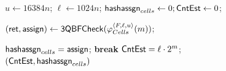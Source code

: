\begin{algorithm}[h]
	\caption{$\mathsf{EqualCellsCounter}(F)$}
	\label{algo:smallcells}
	\begin{algorithmic}[1]
		\State $u \gets 16384n$;
		\State $\ell \gets 1024n$;
                \State $\mathsf{hashassgn}_{cells}\gets 0;\mathsf{CntEst}\gets 0$;



               	\State $\mathsf{(ret,assign)} \gets \mathsf{3QBFCheck}(\varphi^{\langle F,\ell,u\rangle}_{Cells}(m))$; 
               	
		\label{line:eqcells-check}

                \State $\mathsf{hashassgn}_{cells}=\mathsf{assign}$;
		\EndIf
                \State \textbf{break}
		\EndFor
                \State $\mathsf{CntEst}=\ell\cdot 2^m$;\\
                \Return $(\mathsf{CntEst},\mathsf{hashassgn}_{cells})$ 
	\end{algorithmic}
\end{algorithm}


